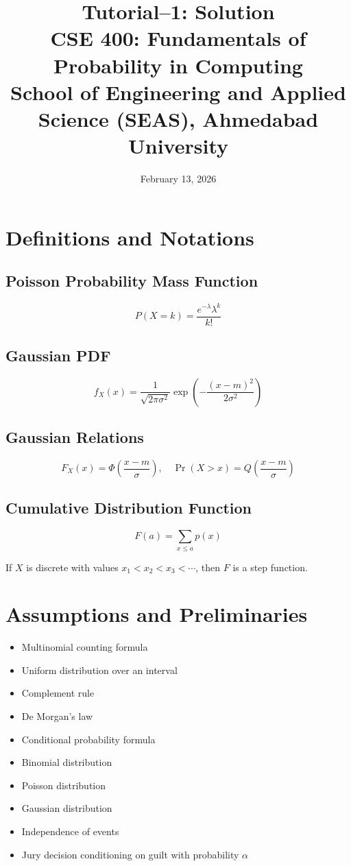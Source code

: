\documentclass[12pt]{article}
\title{Tutorial--1: Solution\\
CSE 400: Fundamentals of Probability in Computing\\
School of Engineering and Applied Science (SEAS), Ahmedabad University}
\date{February 13, 2026}
\begin{document}
\maketitle

\section*{Definitions and Notations}

\subsection*{Poisson Probability Mass Function}
\[
P(X = k) = \frac{e^{-\lambda} \lambda^k}{k!}
\]

\subsection*{Gaussian PDF}
\[
f_X(x) = \frac{1}{\sqrt{2\pi\sigma^2}} 
\exp\left(-\frac{(x-m)^2}{2\sigma^2}\right)
\]

\subsection*{Gaussian Relations}
\[
F_X(x) = \Phi\left(\frac{x-m}{\sigma}\right),
\quad
\Pr(X > x) = Q\left(\frac{x-m}{\sigma}\right)
\]

\subsection*{Cumulative Distribution Function}
\[
F(a) = \sum_{x \le a} p(x)
\]

If $X$ is discrete with values $x_1 < x_2 < x_3 < \cdots$, then $F$ is a step function.

\section*{Assumptions and Preliminaries}

\begin{itemize}
\item Multinomial counting formula
\item Uniform distribution over an interval
\item Complement rule
\item De Morgan's law
\item Conditional probability formula
\item Binomial distribution
\item Poisson distribution
\item Gaussian distribution
\item Independence of events
\item Jury decision conditioning on guilt with probability $\alpha$
\end{itemize}
\end{document}
